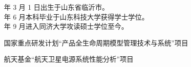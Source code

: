  年 3 月 1 日出生于山东省临沂市。\\
 年 6 月本科毕业于山东科技大学获得学士学位。\\
 年 9 月进入同济大学攻读硕士学位至今。


\begin{enumerate}[{[}1{]}]
\item 国家重点研发计划“产品全生命周期模型管理技术与系统”项目
\item 航天基金“航天卫星电源系统性能分析”项目
\end{enumerate}
